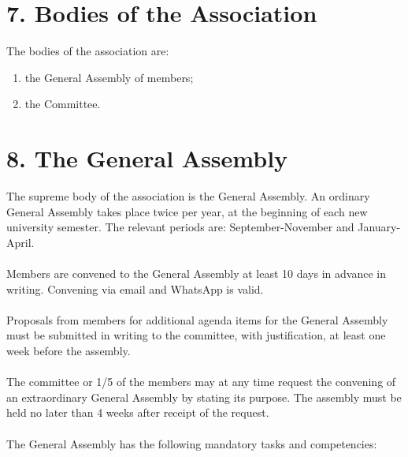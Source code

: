 \documentclass[11pt,a4paper]{article}
\begin{document}
\section*{7. Bodies of the Association}

The bodies of the association are:

\begin{enumerate}
    \item the General Assembly of members;
    \item the Committee.
\end{enumerate}
\section*{8. The General Assembly}

The supreme body of the association is the General Assembly. An ordinary General Assembly takes place twice per year, at the beginning of each new university semester. The relevant periods are: September-November and January-April.
\\\\
Members are convened to the General Assembly at least 10 days in advance in writing. Convening via email and WhatsApp is valid.
\\\\
Proposals from members for additional agenda items for the General Assembly must be submitted in writing to the committee, with justification, at least one week before the assembly.
\\\\
The committee or 1/5 of the members may at any time request the convening of an extraordinary General Assembly by stating its purpose. The assembly must be held no later than 4 weeks after receipt of the request.
\\\\
The General Assembly has the following mandatory tasks and competencies:
\end{document}
